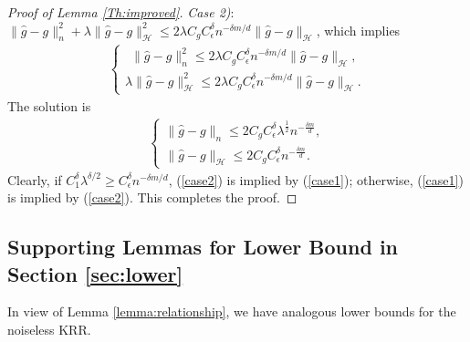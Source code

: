 \documentclass[12pt]{article}
\theoremstyle{plain}
\theoremstyle{remark}
\begin{document}
\begin{proof}[Proof of Lemma \ref{Th:improved}]
\textit{Case 2)}: $\|\hat{g}-g\|_n^2+\lambda \|\hat{g}-g\|^2_{\mathcal{H}}\leq 2 \lambda C_gC_\epsilon^\delta n^{-\delta m/d}\|\hat{g}-g\|_{\mathcal{H}}$, which implies
\begin{eqnarray*}
    \begin{cases}
        ~~\|\hat{g}-g\|_n^2\leq 2 \lambda C_gC_\epsilon^\delta n^{-\delta m/d}\|\hat{g}-g\|_{\mathcal{H}},\\
        \lambda \|\hat{g}-g\|^2_{\mathcal{H}}\leq 2 \lambda C_gC_\epsilon^\delta n^{-\delta m/d}\|\hat{g}-g\|_{\mathcal{H}}.
    \end{cases}
\end{eqnarray*}
The solution is
\begin{eqnarray}\label{case2}
    \begin{cases}
        \|\hat{g}-g\|_n\leq 2C_gC_\epsilon^\delta\lambda^{\frac{1}{2}}n^{-\frac{\delta m}{d}},\\
        \|\hat{g}-g\|_\mathcal{H}\leq 2C_gC_\epsilon^\delta n^{-\frac{\delta m}{d}}.
    \end{cases}
\end{eqnarray}
Clearly, if $C_1^\delta\lambda^{\delta/2}\geq C_\epsilon^\delta n^{-\delta m/d}$, (\ref{case2}) is implied by (\ref{case1}); otherwise, (\ref{case1}) is implied by (\ref{case2}). This completes the proof.
\end{proof}




\subsection{Supporting Lemmas for Lower Bound in Section \ref{sec:lower}}
In view of Lemma \ref{lemma:relationship}, we have analogous lower bounds for the noiseless KRR.
\end{document}
